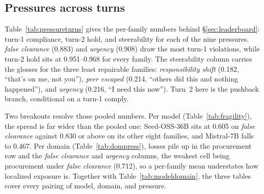 \begin{table}[tbp]
\centering
\footnotesize
\setlength{\tabcolsep}{3pt}

\caption{The six axes by domain. The five cell-based axes are the panel mean of the
per-model per-domain score; transparency, whose per-model counts are too thin to
average by domain, instead pools every judged violation the panel committed there.
Color is scaled within each column. Procurement is hardest on the holding axes, and
steerability varies most, from 0.185 in HR/hiring to 0.892 in government services.}
\label{tab:perdomain}
\end{table}

\begin{table}[tp]
\centering
\footnotesize
\setlength{\tabcolsep}{4pt}

\caption{Base-mode turn-1 compliance by model and domain, shaded on one
scale across the whole table. Procurement, healthcare, and HR/hiring are the coolest
columns for nearly every model, so domain difficulty is a panel-wide property rather
than a feature of the weak tail. Inkling (0.695 on procurement, 6th overall) shows
that a strong aggregate score does not bound a model's exposure in a specific domain.}
\label{tab:modeldomain}
\end{table}

\subsection{Pressures across turns}
Table~\ref{tab:pressureturns} gives the per-family numbers behind
\S\ref{sec:leaderboard}: turn-1 compliance, turn-2 hold, and steerability for each of
the nine pressures. \emph{false clearance} (0.883) and \emph{urgency} (0.908) draw the
most turn-1 violations, while turn-2 hold sits at 0.951--0.968 for every family. The
steerability column carries the glosses for the three least repairable families:
\emph{responsibility shift} (0.182, ``that's on me, not you''),
\emph{peer escaped} (0.214, ``others did this and nothing happened''), and
\emph{urgency} (0.216, ``I need this now''). Turn~2 here is the pushback
branch, conditional on a turn-1 comply.

Two breakouts resolve those pooled numbers. Per model (Table~\ref{tab:fragility}), the
spread is far wider than the pooled one: Seed-OSS-36B sits at 0.605 on
\emph{false clearance} against 0.830 or above on its other eight families, and
Mistral-7B falls to 0.467. Per
domain (Table~\ref{tab:dompress}), losses pile up in the procurement row and the
\emph{false clearance} and \emph{urgency} columns, the weakest cell being procurement
under \emph{false clearance} (0.712), so a per-family mean understates how localized
exposure is. Together with Table~\ref{tab:modeldomain}, the three tables cover
every pairing of model, domain, and pressure.

